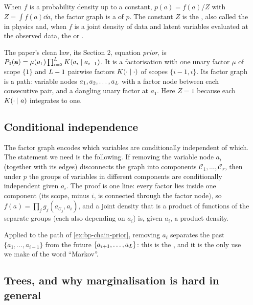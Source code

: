 When $f$ is a probability density up to a constant, $p(a)=f(a)/Z$ with
$Z=\int f(a)\dd a$, the factor graph is a  of $p$. The constant
$Z$ is the , also called the  in physics and,
when $f$ is a joint density of data and latent variables evaluated at the observed data,
the  or .

\begin{example}
\label{ex:bp-chain-prior}
The paper's clean law, its Section 2, equation \emph{prior}, is
$P_0(\mathbf{a})=\mu(a_1)\prod_{i=2}^{L}K(a_i\mid a_{i-1})$. It is a factorisation
with one unary factor $\mu$ of scope $\{1\}$ and $L-1$ pairwise factors
$K(\cdot\mid\cdot)$ of scopes $\{i-1,i\}$. Its factor graph is a path: variable
nodes $a_1,a_2,\dots,a_L$ with a factor node between each consecutive pair, and
a dangling unary factor at $a_1$. Here $Z=1$ because each $K(\cdot\mid a)$
integrates to one.
\end{example}

\subsection{Conditional independence}

The factor graph encodes which variables are conditionally independent of which. The
statement we need is the following. If removing the variable node $a_i$ (together with
its edges) disconnects the graph into components $\mathcal{C}_1,\dots,\mathcal{C}_r$,
then under $p$ the groups of variables in different components are conditionally
independent given $a_i$. The proof is one line: every factor lies inside one component
(its scope, minus $i$, is connected through the factor node), so
$f(a)=\prod_j g_j(a_{\mathcal{C}_j},a_i)$, and a joint density that is a product of
functions of the separate groups (each also depending on $a_i$) is, given $a_i$, a
product density.

Applied to the path of \cref{ex:bp-chain-prior}, removing $a_i$ separates the past
$\{a_1,\dots,a_{i-1}\}$ from the future $\{a_{i+1},\dots,a_L\}$: this is the
, and it is the only use we make of the word ``Markov''.

\subsection{Trees, and why marginalisation is hard in general}

